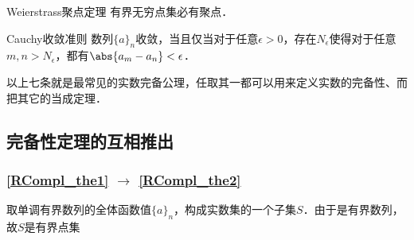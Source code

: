 \begin{theorem}{Weierstrass聚点定理}\label{RCompl_the6}
有界无穷点集必有聚点．
\end{theorem}

\begin{theorem}{Cauchy收敛准则}\label{RCompl_the7}
数列$\{a\}_n$收敛，当且仅当对于任意$\epsilon>0$，存在$N_\epsilon$使得对于任意$m, n>N_\epsilon$，都有$\abs{a_m-a_n}<\epsilon$．
\end{theorem}

以上七条就是最常见的实数完备公理，任取其一都可以用来定义实数的完备性、而把其它的当成定理．

\subsection{完备性定理的互相推出}

\subsubsection{\autoref{RCompl_the1} $\to$ \autoref{RCompl_the2} }

取单调有界数列的全体函数值$\{a\}_n$，构成实数集的一个子集$S$．由于是有界数列，故$S$是有界点集













